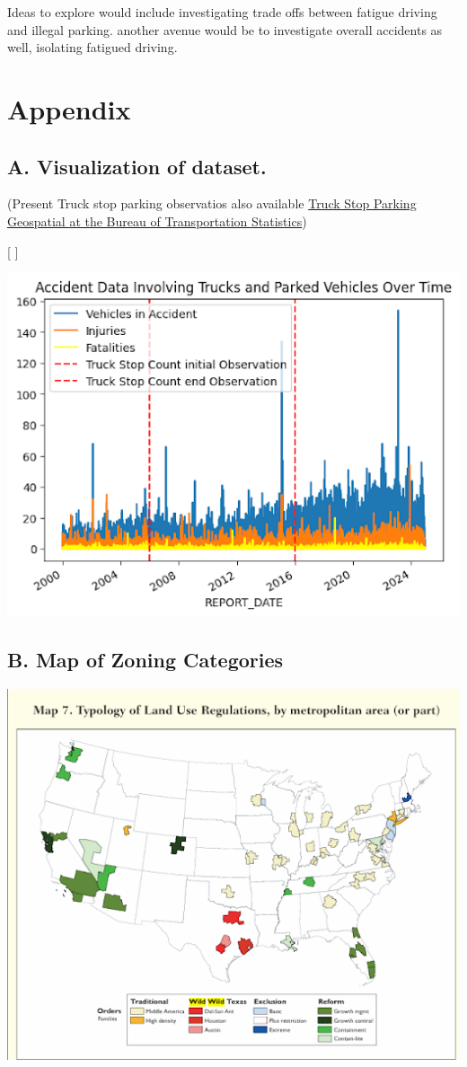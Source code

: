 \documentclass[
  12pt]{article}
\begin{document}
Ideas to explore would include investigating trade offs between fatigue
driving and illegal parking. another avenue would be to investigate
overall accidents as well, isolating fatigued driving.

\section{\texorpdfstring{\textbf{Appendix}}{Appendix}}\label{appendix}

\subsection{\texorpdfstring{\textbf{A. Visualization of
dataset.}}{A. Visualization of dataset.}}\label{sec-a.-visualization-of-dataset.-}

(Present Truck stop parking observatios also available
\href{https://data-usdot.opendata.arcgis.com/datasets/usdot::truck-stop-parking/about}{Truck
Stop Parking \textbar{} Geospatial at the Bureau of Transportation
Statistics})

{[} \citet{coWilliamClintCResearchProposalTrucks2024}{]}

\includegraphics{images/unnamed.png}

\subsection{B. Map of Zoning
Categories}\label{sec-b.-map-of-zoning-categories}

\includegraphics{images/unnamed (1).png}


  
\end{document}

